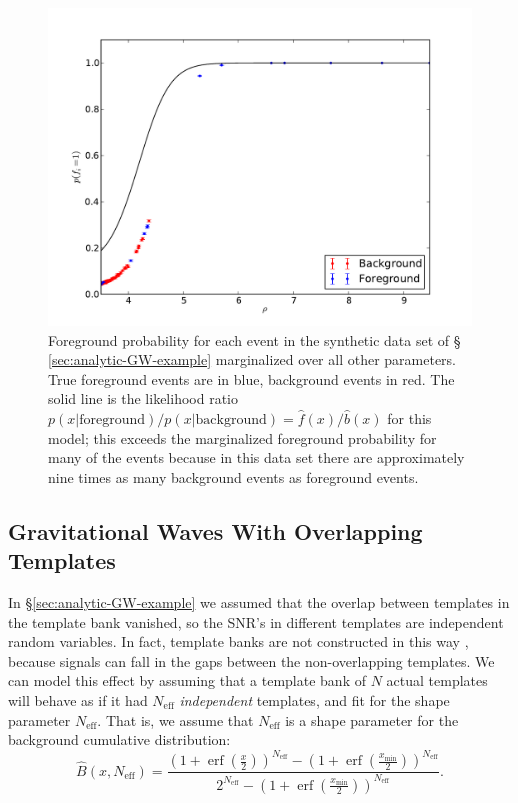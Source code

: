 \documentclass[aps,prd]{revtex4-1}
\newcommand{\xmin}{x_\mathrm{min}}
\DeclareMathOperator{\erf}{erf}
\begin{document}
\begin{figure}
  \includegraphics[width=\columnwidth]{pfore}
  \caption{\label{fig:analytic-rate-foreground-probs} Foreground
    probability for each event in the synthetic data set of \S
    \ref{sec:analytic-GW-example} marginalized over all other
    parameters.  True foreground events are in blue, background events
    in red.  The solid line is the likelihood ratio
    $p(x|\mathrm{foreground})/p(x|\mathrm{background}) =
    \hat{f}(x)/\hat{b}(x)$ for this model; this exceeds the
    marginalized foreground probability for many of the events because
    in this data set there are approximately nine times as many
    background events as foreground events. }
\end{figure}

\subsection{Gravitational Waves With Overlapping Templates}
\label{sec:gw-overlapping-template}

In \S \ref{sec:analytic-GW-example} we assumed that the overlap
between templates in the template bank vanished, so the SNR's in
different templates are independent random variables.  In fact,
template banks are not constructed in this way
\citep{Caudill2011,Cannon2011}, because signals can fall in the gaps
between the non-overlapping templates.  We can model this effect by
assuming that a template bank of $N$ actual templates will behave as
if it had $N_\mathrm{eff}$ \emph{independent} templates, and fit for
the shape parameter $N_\mathrm{eff}$.  That is, we assume that
$N_\mathrm{eff}$ is a shape parameter for the background cumulative
distribution:
\begin{equation}
  \hat{B}\left(x, N_\mathrm{eff}\right) = \frac{\left( 1 + \erf\left( \frac{x}{2} \right)
    \right)^{N_\mathrm{eff}} - \left( 1 + \erf\left( \frac{\xmin}{2} \right)
    \right)^{N_\mathrm{eff}}}{2^{N_\mathrm{eff}} - \left( 1 + \erf\left( \frac{\xmin}{2} \right)
    \right)^{N_\mathrm{eff}} }.
\end{equation}
\end{document}
